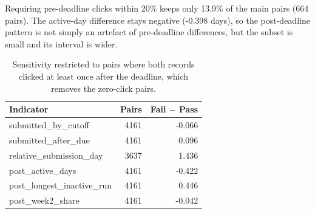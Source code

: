 \documentclass[11pt]{article}
\begin{document}
Requiring pre-deadline clicks within 20\% keeps only 13.9\% of the main pairs (664 pairs). The active-day difference stays negative (-0.398 days), so the post-deadline pattern is not simply an artefact of pre-deadline differences, but the subset is small and its interval is wider.
\begin{table}[t]
\centering
\footnotesize
\begin{tabular}{lrr}
\toprule
Indicator & Pairs & Fail $-$ Pass \\
\midrule
submitted\_by\_cutoff & 4161 & -0.066 \\
submitted\_after\_due & 4161 & 0.096 \\
relative\_submission\_day & 3637 & 1.436 \\
post\_active\_days & 4161 & -0.422 \\
post\_longest\_inactive\_run & 4161 & 0.446 \\
post\_week2\_share & 4161 & -0.042 \\
\bottomrule
\end{tabular}
\caption{Sensitivity restricted to pairs where both records clicked at least once after the deadline, which removes the zero-click pairs.}
\label{tab:postsens}
\end{table}
\end{document}
